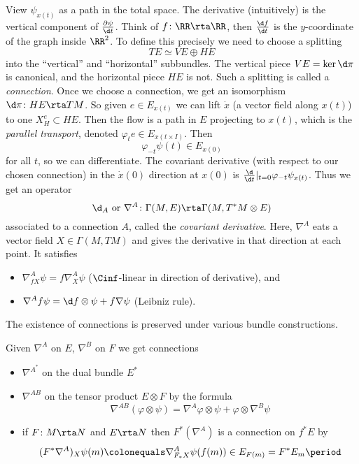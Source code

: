 View $\psi_{x(t)}$ as a path in the total space. The derivative (intuitively) is the vertical component of $\frac{\partial\psi}{\d t}$. Think of $f\colon\RR\rta\RR$, then $\frac{\d f}{\d t}$ is the $y$-coordinate of the graph inside $\RR^2$. 
To define this precisely we need to choose a splitting
\[
	TE\simeq VE\oplus HE
\]
into the ``vertical'' and ``horizontal'' subbundles.
The vertical piece $VE=\ker \d\pi$ is canonical, and the horizontal piece $HE$ is not. Such a splitting is called a \emph{connection}. 
Once we choose a connection, 
we get an isomorphism $\d\pi\colon HE\rta TM$. 
So given $e\in E_{x(t)}$ we can lift $\dot{x}$ (a vector field along $x(t)$) to one $X^e_H\subset HE$. 
Then the flow is a path in $E$ projecting to $x(t)$, which is the \emph{parallel transport}, denoted $\varphi_te\in E_{x(t\times I)}$. Then
\[
	\varphi_{-t}\psi(t)\in E_{x(0)}
\]
for all $t$, so we can differentiate. 
The covariant derivative (with respect to our chosen connection) in the $\dot{x}(0)$ direction at $x(0)$ is 
$\frac{\d}{\d t}\vert_{t=0}\varphi_{-t}\psi_{x(t)}$. 
Thus we get an operator
\[
	\d_{A}\text{ or }\nabla^A\colon\Gamma(M,E)\rta\Gamma(M,T^*M\otimes E)
\]
associated to a connection $A$, called the \emph{covariant derivative}. 
Here, $\nabla^A$ eats a vector field $X\in\Gamma(M,TM)$ and gives the derivative in that direction at each point. It satisfies
\begin{itemize}
	\item $\nabla_{fX}^A\psi=f\nabla_X^A\psi$ ($\Cinf$-linear in direction of derivative), and 

	\item $\nabla^Af\psi=\d f\otimes\psi+f\nabla\psi$ (Leibniz rule).
\end{itemize}

The existence of connections is preserved under various bundle constructions.  

\begin{prop}\label{properties of connections}
Given $\nabla^A$ on $E$, $\nabla^B$ on $F$ we get connections
\begin{itemize}
	\item $\nabla^{A^*}$ on the dual bundle $E^*$

	\item $\nabla^{AB}$ on the tensor product $E\otimes F $ by the formula 
\[\nabla^{AB}(\varphi\otimes\psi)=\nabla^A\varphi\otimes\psi+\varphi\otimes\nabla^B\psi\]

	\item if $F\colon M\rta N$ and $E\rta N$ then $F^*(\nabla^A)$ is a connection on  $f^*E$ by
		\[
			(F^*\nabla^A)_X\psi(m)\colonequals \nabla^A_{F_*X}\psi(f(m))\in E_{F(m)}=F^*E_m \period 
		\]
\end{itemize}
\end{prop}

